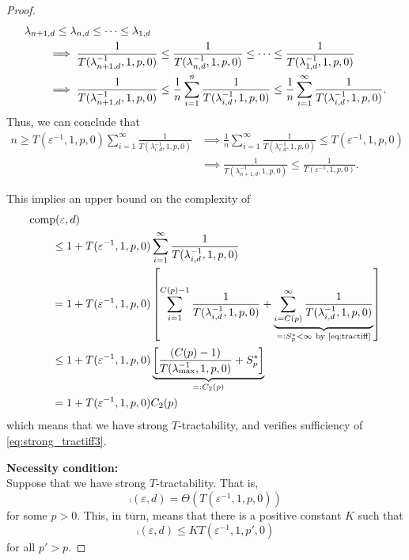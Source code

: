 \documentclass[11pt,a4paper]{article}
\begin{document}
{\begin{proof}
\begin{align*}
    \MoveEqLeft{\lambda_{n+1,d} \le \lambda_{n,d} \le \cdots \le \lambda_{1,d}} \\
    & \implies \frac{1}{T(\lambda_{n+1, d}^{-1},1,p,0)} \le \frac{1}{T(\lambda_{n, d}^{-1},1,p,0)} \le \cdots \le \frac{1}{T(\lambda_{1, d}^{-1},1,p,0)} \\
    & \implies \frac{1}{T(\lambda_{n+1, d}^{-1},1,p,0) }
    \le \frac 1n \sum_{i=1}^n  \frac{1}{T(\lambda_{i, d}^{-1},1,p,0) }
    \le \frac 1n \sum_{i=1}^\infty  \frac{1}{T(\lambda_{i, d}^{-1},1,p,0)}.
\end{align*}
Thus, we can conclude that 
\begin{align*}
    n \ge T(\varepsilon^{-1},1,p,0) \sum_{i=1}^\infty \frac{1}{T(\lambda_{i, d}^{-1},1,p,0)}
    & \implies 
\frac 1n \sum_{i=1}^\infty \frac{1}{T(\lambda_{i, d}^{-1},1,p,0) }\le  T(\varepsilon^{-1},1,p,0) \\
   & \implies   \frac{1}{T(\lambda_{n+1, d}^{-1},1,p,0)} \le \frac{1}{T(\varepsilon^{-1},1,p,0)}.
\end{align*}

This implies an upper bound on the complexity of
\begin{align*}
       \MoveEqLeft{\comp(\varepsilon,d)} \\
       &\le 1 + T(\varepsilon^{-1},1,p,0) \sum_{i=1}^\infty \frac{1}{T(\lambda_{i, d}^{-1},1,p,0)} \\
       & = 1 + T(\varepsilon^{-1},1, p,0) \left [ \sum_{i=1}^{C(p)-1} \frac{1}{T(\lambda_{i, d}^{-1},1,p,0)}
       + \underbrace{\sum_{i=C(p)}^\infty \frac{1}{T(\lambda_{i, d}^{-1},1,p,0)}}_{=:S_p^* <\infty\ \text{by \eqref{eq:tractiff}} }\right] \\
       & \le 1+ T(\varepsilon^{-1},1,p,0) \underbrace{\left[\frac{(C(p)-1)}{T(\lambda_{\max}^{-1},1,p,0)} + S_p^*\right]}_{=:C_2(p)}\\
       & = 1+ T(\varepsilon^{-1},1,p,0) C_2 (p)
\end{align*}
which means that we have strong $T$-tractability, and verifies sufficiency of \eqref{eq:strong_tractiff3}. 

\bigskip

\bigskip
\noindent \textbf{Necessity condition:} \\
Suppose that we have strong 
$T$-tractability. That is, 
\[
\comp(\varepsilon,d)=\Theta (T(\varepsilon^{-1},1,p,0))
\]
for some $p>0$. This, in turn, means that there is a positive constant $K$ such that
\begin{equation}\label{eq_strong_tract_p'3}
\comp(\varepsilon,d)\le K T(\varepsilon^{-1},1,p',0)
\end{equation}
for all $p'>p$. 


\end{proof}}
\end{document}
